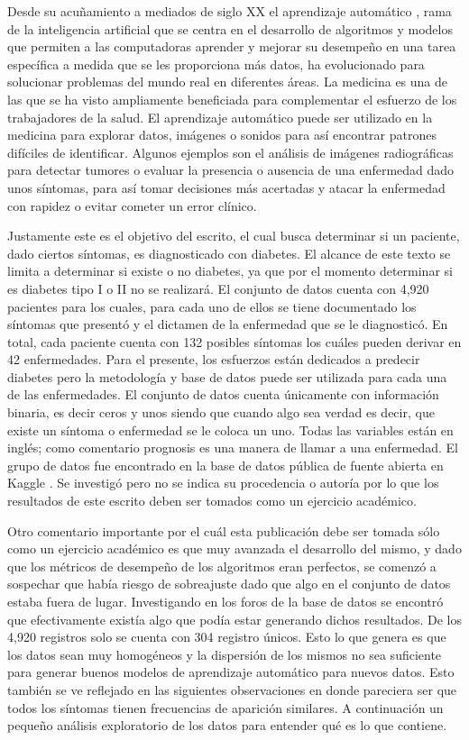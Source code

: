 \documentclass[twocolumn]{bmcart}%
\begin{document}
Desde su acuñamiento a mediados de siglo XX el aprendizaje automático , rama de la inteligencia artificial que se centra en el desarrollo de algoritmos y modelos que permiten a las computadoras aprender y mejorar su desempeño en una tarea específica a medida que se les proporciona más datos, ha evolucionado para solucionar problemas del mundo real en diferentes áreas. La medicina es una de las que se ha visto ampliamente beneficiada para complementar el esfuerzo de los  trabajadores de la salud. El aprendizaje automático puede ser utilizado en la medicina para explorar datos, imágenes o sonidos para así encontrar patrones difíciles de identificar. Algunos ejemplos son el análisis de imágenes radiográficas  para detectar tumores o evaluar la presencia o ausencia de una enfermedad dado unos síntomas, para así tomar decisiones más acertadas y atacar la enfermedad con rapidez o evitar cometer un error clínico. 

Justamente este es el objetivo del escrito, el cual busca determinar si un paciente, dado ciertos síntomas, es diagnosticado con diabetes. El alcance de este texto se limita a determinar si existe o no diabetes, ya que por el momento determinar si es diabetes tipo I o II no se realizará. El conjunto de datos cuenta con 4,920 pacientes para los cuales, para cada uno de ellos se tiene documentado los síntomas que presentó y el dictamen de la enfermedad que se le diagnosticó. En total, cada paciente cuenta con 132 posibles síntomas los cuáles pueden derivar en 42 enfermedades. Para el presente, los esfuerzos están dedicados a predecir diabetes pero la metodología y base de datos puede ser utilizada para cada una de las enfermedades. El conjunto de datos cuenta únicamente con información binaria, es decir ceros y unos siendo que cuando algo sea verdad es decir, que existe un síntoma o enfermedad se le coloca un uno. Todas las variables están en inglés; como comentario prognosis es una manera de llamar a una enfermedad. El grupo de datos fue encontrado en la base de datos pública de fuente abierta en Kaggle \cite{Kaggle}. Se investigó pero no se indica su procedencia o autoría por lo que los resultados de este escrito deben ser tomados como un ejercicio académico. 

Otro comentario importante por el cuál esta publicación debe ser tomada sólo como un ejercicio académico es que muy avanzada el desarrollo del mismo, y dado que los métricos de desempeño de los algoritmos eran perfectos, se comenzó a sospechar que había riesgo de sobreajuste dado que algo en el conjunto de datos estaba fuera de lugar. Investigando en los foros de la base de datos se encontró que efectivamente existía algo que podía estar generando dichos resultados. De los 4,920 registros solo se cuenta con 304 registro únicos. Esto lo que genera es que los datos sean muy homogéneos y la dispersión de los mismos no sea suficiente para generar buenos modelos de aprendizaje automático para nuevos datos. Esto también se ve reflejado en las siguientes observaciones en donde pareciera ser que todos los síntomas tienen frecuencias de aparición similares.  A continuación un pequeño análisis exploratorio de los datos para entender qué es lo que contiene. 
\end{document}

